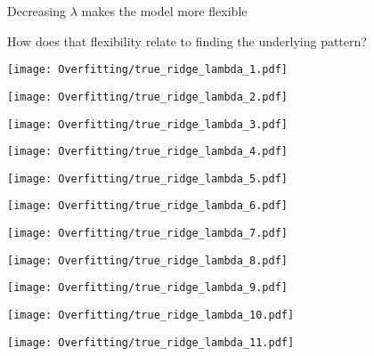 \documentclass[xcolor=pdftex,dvipsnames,table]{beamer}
\begin{document}
\frame
{
	Decreasing $\lambda$ makes the model more flexible
}

\frame
{
	How does that flexibility relate to finding the underlying pattern?
}

\frame
{
	\begin{center}
		\texttt{[image: Overfitting/true\_ridge\_lambda\_1.pdf]}
	\end{center}
}

\frame
{
	\begin{center}
		\texttt{[image: Overfitting/true\_ridge\_lambda\_2.pdf]}
	\end{center}
}

\frame
{
	\begin{center}
		\texttt{[image: Overfitting/true\_ridge\_lambda\_3.pdf]}
	\end{center}
}

\frame
{
	\begin{center}
		\texttt{[image: Overfitting/true\_ridge\_lambda\_4.pdf]}
	\end{center}
}

\frame
{
	\begin{center}
		\texttt{[image: Overfitting/true\_ridge\_lambda\_5.pdf]}
	\end{center}
}

\frame
{
	\begin{center}
		\texttt{[image: Overfitting/true\_ridge\_lambda\_6.pdf]}
	\end{center}
}

\frame
{
	\begin{center}
		\texttt{[image: Overfitting/true\_ridge\_lambda\_7.pdf]}
	\end{center}
}

\frame
{
	\begin{center}
		\texttt{[image: Overfitting/true\_ridge\_lambda\_8.pdf]}
	\end{center}
}

\frame
{
	\begin{center}
		\texttt{[image: Overfitting/true\_ridge\_lambda\_9.pdf]}
	\end{center}
}

\frame
{
	\begin{center}
		\texttt{[image: Overfitting/true\_ridge\_lambda\_10.pdf]}
	\end{center}
}

\frame
{
	\begin{center}
		\texttt{[image: Overfitting/true\_ridge\_lambda\_11.pdf]}
	\end{center}
}
\end{document}
